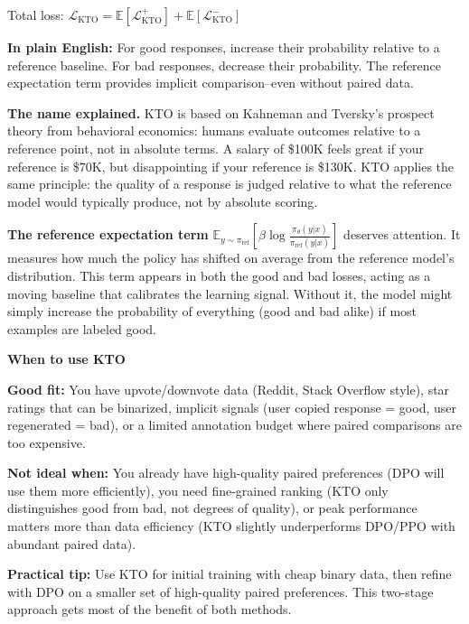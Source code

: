 \begin{chapterenv}
\begin{infobox}
Total loss: $\mathcal{L}_{\text{KTO}} = \mathbb{E}[\mathcal{L}_{\text{KTO}}^{+}] + \mathbb{E}[\mathcal{L}_{\text{KTO}}^{-}]$

\textbf{In plain English:} For good responses, increase their probability relative to a reference baseline. For bad responses, decrease their probability. The reference expectation term provides implicit comparison--even without paired data.
\end{infobox}

\textbf{The name explained.} KTO is based on Kahneman and Tversky's prospect theory from behavioral economics: humans evaluate outcomes relative to a reference point, not in absolute terms. A salary of \$100K feels great if your reference is \$70K, but disappointing if your reference is \$130K. KTO applies the same principle: the quality of a response is judged relative to what the reference model would typically produce, not by absolute scoring.

\textbf{The reference expectation term} $\mathbb{E}_{y \sim \pi_{\text{ref}}}[\beta \log \frac{\pi_\theta(y|x)}{\pi_{\text{ref}}(y|x)}]$ deserves attention. It measures how much the policy has shifted on average from the reference model's distribution. This term appears in both the good and bad losses, acting as a moving baseline that calibrates the learning signal. Without it, the model might simply increase the probability of everything (good and bad alike) if most examples are labeled good.

\begin{tipbox}
\textbf{When to use KTO}

\textbf{Good fit:} You have upvote/downvote data (Reddit, Stack Overflow style), star ratings that can be binarized, implicit signals (user copied response = good, user regenerated = bad), or a limited annotation budget where paired comparisons are too expensive.

\textbf{Not ideal when:} You already have high-quality paired preferences (DPO will use them more efficiently), you need fine-grained ranking (KTO only distinguishes good from bad, not degrees of quality), or peak performance matters more than data efficiency (KTO slightly underperforms DPO/PPO with abundant paired data).

\textbf{Practical tip:} Use KTO for initial training with cheap binary data, then refine with DPO on a smaller set of high-quality paired preferences. This two-stage approach gets most of the benefit of both methods.
\end{tipbox}


\end{chapterenv}
